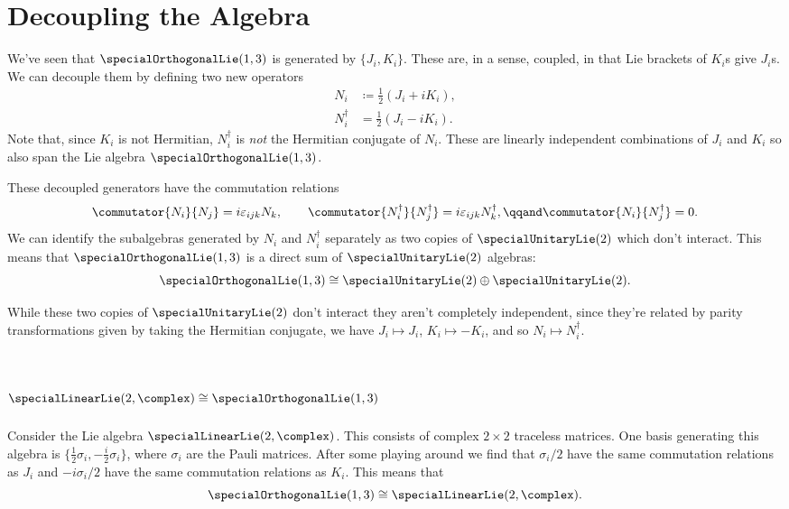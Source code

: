 \documentclass[fleqn]{NotesClass}
\newcommand{\isomorphic}{\cong}
\newcommand{\hermit}{\dagger}
\begin{document}
    \section{Decoupling the Algebra}
    We've seen that \(\specialOrthogonalLie(1, 3)\) is generated by \(\{J_i, K_i\}\).
    These are, in a sense, coupled, in that Lie brackets of \(K_i\)s give \(J_i\)s.
    We can decouple them by defining two new operators
    \begin{align}
        N_i &\coloneqq \frac{1}{2}(J_i + i K_i),\\
        N_i^\hermit &= \frac{1}{2}(J_i - i K_i).
    \end{align}
    Note that, since \(K_i\) is not Hermitian, \(N_i^\hermit\) is \emph{not} the Hermitian conjugate of \(N_i\).
    These are linearly independent combinations of \(J_i\) and \(K_i\) so also span the Lie algebra \(\specialOrthogonalLie(1, 3)\).
    
    These decoupled generators have the commutation relations
    \begin{equation}
        \commutator{N_i}{N_j} = i\varepsilon_{ijk}N_k, \qquad \commutator{N_i^\hermit}{N_j^\hermit} = i\varepsilon_{ijk}N_k^\hermit, \qqand \commutator{N_i}{N_j^\hermit} = 0.
    \end{equation}
    We can identify the subalgebras generated by \(N_i\) and \(N_i^\hermit\) separately as two copies of \(\specialUnitaryLie(2)\) which don't interact.
    This means that \(\specialOrthogonalLie(1, 3)\) is a direct sum of \(\specialUnitaryLie(2)\) algebras:
    \begin{equation}
        \specialOrthogonalLie(1, 3) \isomorphic \specialUnitaryLie(2) \oplus \specialUnitaryLie(2).
    \end{equation}
    
    While these two copies of \(\specialUnitaryLie(2)\) don't interact they aren't completely independent, since they're related by parity transformations given by taking the Hermitian conjugate, we have \(J_i \mapsto J_i\), \(K_i \mapsto -K_i\), and so \(N_i \mapsto N_i^\hermit\).
    
    \section{\texorpdfstring{\(\specialLinearLie(2, \complex) \isomorphic \specialOrthogonalLie(1, 3)\)}{sl(2, C) isomorphic to so(1, 3)}}
    Consider the Lie algebra \(\specialLinearLie(2, \complex)\).
    This consists of complex \(2 \times 2\) traceless matrices.
    One basis generating this algebra is \(\{\tfrac{1}{2}\sigma_i, -\tfrac{i}{2}\sigma_i\}\), where \(\sigma_i\) are the Pauli matrices.
    After some playing around we find that \(\sigma_i/2\) have the same commutation relations as \(J_i\) and \(-i\sigma_i/2\) have the same commutation relations as \(K_i\).
    This means that
    \begin{equation}
        \specialOrthogonalLie(1, 3) \isomorphic \specialLinearLie(2, \complex).
    \end{equation}
    
\end{document}
